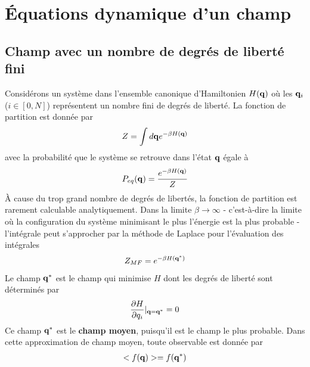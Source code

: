 \section{Équations dynamique d'un champ}

    \subsection{Champ avec un nombre de degrés de liberté fini}
Considérons un système dans l'ensemble canonique d'Hamiltonien  $H({\bf q})$ où les ${\bf q}_i$ ($i \in [0,N]$) représentent un nombre fini de degrés de liberté. La fonction de partition est donnée par 
\begin{align}
    Z = \int d{\bf q} e^{-\beta H({\bf q})}
\end{align}
avec la probabilité que le système se retrouve dans l'état ${\bf q}$ égale à
\begin{align}
    P_{eq}({\bf q}) = \frac{e^{-\beta H({\bf q})}}{Z}
    \label{eqdis}
\end{align}
À cause du trop grand nombre de degrés de libertés, la fonction de partition est rarement calculable analytiquement. Dans la limite $\beta \to \infty$ - c'est-à-dire la limite où la configuration du système minimisant le plus l'énergie est la plus probable - l'intégrale peut s'approcher par la méthode de Laplace pour l'évaluation des intégrales 
\begin{align}
    Z_{MF}= e^{-\beta H({\bf q}^*)}
\end{align}
Le champ ${\bf q}^*$ est le champ qui minimise $H$ dont les degrés de liberté sont déterminés par
\begin{align}
    \frac{\partial H}{\partial q_i}|_{{\bf q}={\bf q^*}}=0
\end{align}
Ce champ ${\bf q}^*$ est le \textbf{champ moyen}, puisqu'il est le champ le plus probable. Dans cette approximation de champ moyen, toute observable est donnée par
\begin{align}
    < f({\bf q}) > = f({\bf q}^*)
\end{align}

